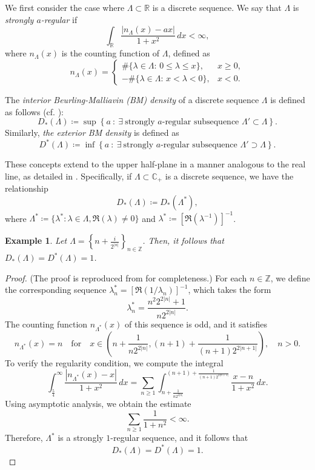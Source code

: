 \documentclass[12pt,a4paper]{amsart}
\newtheorem{Example}[Definition]{Example}
\begin{document}
We first consider the case where \( \Lambda \subset \mathbb{R} \) is a discrete sequence. We say that \( \Lambda \) is \emph{strongly \( a \)-regular }if
\[
\int_\mathbb{R} \frac{|n_{\Lambda}(x) - ax|}{1 + x^2} \, dx < \infty,
\]
where \( n_\Lambda(x) \) is the counting function of \( \Lambda \), defined as
\[
n_\Lambda(x)
=
\begin{cases}
	\#\{\lambda\in\Lambda:\,0\le\lambda\le x\},&x\ge0,\\
	-\#\{\lambda\in\Lambda:\,x<\lambda<0\},&x<0.
\end{cases}
\]

The \emph{interior Beurling-Malliavin (BM) density} of a discrete sequence \( \Lambda \) is defined as follows (cf. \cite{Mitkovski2010}):
\[
D_\ast(\Lambda) \coloneqq \sup \left\{ a \ : \ \exists \ \text{strongly } a\text{-regular subsequence } \Lambda' \subset \Lambda \right\}.
\]
Similarly, \emph{the exterior BM density} is defined as
\[
D^\ast(\Lambda) \coloneqq \inf \left\{ a \ : \ \exists \ \text{strongly } a\text{-regular subsequence } \Lambda' \supset \Lambda \right\}.
\]

These concepts extend to the upper half-plane in a manner analogous to the real line, as detailed in \cite{marakov2010}. Specifically, if \( \Lambda \subset \mathbb{C}_+ \) is a discrete sequence, we have the relationship
\[
D_\ast(\Lambda) \coloneqq D_\ast(\Lambda^\ast),
\]
where \( \Lambda^\ast \coloneqq \{\lambda^\ast : \lambda \in \Lambda, \mathfrak{R}(\lambda) \neq 0 \} \) and \( \lambda^\ast \coloneqq \left[ \mathfrak{R}(\lambda^{-1}) \right]^{-1} \).


\begin{Example}
Let \( \Lambda = \left\{ n + \frac{i}{2^{|n|}} \right\}_{n \in \mathbb{Z}} \). Then, it follows that \( D_\ast(\Lambda) = D^\ast(\Lambda) = 1 \).
\end{Example}

\begin{proof}
(The proof is reproduced from \cite{FRR18} for completeness.) For each \( n \in \mathbb{Z} \), we define the corresponding sequence \( \lambda_n^\ast = \left[ \mathfrak{R}(1/\lambda_n) \right]^{-1} \), which takes the form
\[
\lambda_n^\ast = \frac{n^2 2^{2|n|} + 1}{n 2^{2|n|}}.
\]
The counting function \( n_{\Lambda^\ast}(x) \) of this sequence is odd, and it satisfies
\[
n_{\Lambda^\ast}(x) = n \quad \text{for} \quad x \in \left( n + \frac{1}{n 2^{2|n|}}, (n+1) + \frac{1}{(n+1) 2^{2|n+1|}} \right), \quad n > 0.
\]
To verify the regularity condition, we compute the integral
\[
\int_{\frac{5}{4}}^\infty \frac{|n_{\Lambda^\ast}(x) - x|}{1 + x^2} \, dx = \sum_{n \geq 1} \int_{n + \frac{1}{n 2^{2|n|}}}^{(n+1) + \frac{1}{(n+1) 2^{2|n+1|}}} \frac{x - n}{1 + x^2} \, dx.
\]
Using asymptotic analysis, we obtain the estimate
\[
\sum_{n \geq 1} \frac{1}{1 + n^2} < \infty.
\]
Therefore, \( \Lambda^\ast \) is a strongly \( 1 \)-regular sequence, and it follows that
\[
D_\ast(\Lambda) = D^\ast(\Lambda) = 1.
\]
\end{proof}
\end{document}
